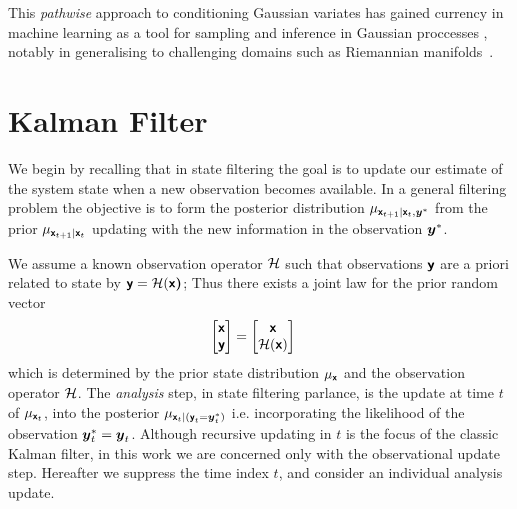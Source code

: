 \documentclass[wcp]{jmlr} %
\begin{document}
This \emph{pathwise} approach to conditioning Gaussian variates has gained currency in machine learning as a tool for sampling and inference in Gaussian proccesses \citep{Wilson2020Efficiently,Wilson2021Pathwise}, notably in generalising to challenging domains such as Riemannian manifolds~\citep{Borovitskiy2020Matern}.


\section{Kalman Filter}
We begin by recalling that in state filtering the goal is to update our estimate of the system state when a new observation becomes available. In a general filtering problem the objective is to form the posterior distribution \(\Law[\vrv{x}_{t+1} \gvn \vrv{x}_t, \vv{y}^*]\) from the prior \(\Law[\vrv{x}_{t+1} \gvn \vrv{x}_t]\) updating with  the new information in the observation \(\boldsymbol{y}^*\).

We assume a known observation operator $\mathcal{H}$ such that observations $\boldsymbol{\mathsf{y}}$ are a priori related to state  by $\boldsymbol{\mathsf{y}}=\mathcal{H}(\boldsymbol{\mathsf{x}}\boldsymbol{\mathsf{)}}$; Thus there exists a joint law for the prior random vector
\begin{align}
    \begin{bmatrix}
        \boldsymbol{\mathsf{x}}\\
        \boldsymbol{\mathsf{y}}
    \end{bmatrix} &= \begin{bmatrix}
        \boldsymbol{\mathsf{x}}\\
        \mathcal{H}(\boldsymbol{\mathsf{x}})
    \end{bmatrix}\label{eq:joint-law}
\end{align}
which is determined by the prior state distribution $\Law[\vrv{x}]$ and the observation operator $\mathcal{H}$.
The  \emph {analysis} step, in state filtering parlance, is the update at time $t$ of  \(\Law[\vrv{x}_{t}]\), into the posterior \( \Law[\vrv{x}_t \gvn (\vrv{y}_t{=}\vv{y}_t^*)]\)
i.e. incorporating the likelihood of the observation $\boldsymbol{y}_t^*=\boldsymbol{y}_t$.
Although  recursive updating in $t$ is the focus of the classic Kalman filter, in this work we are concerned only with the observational update step.
Hereafter we suppress the time index $t$, and consider an individual analysis update.
\end{document}
